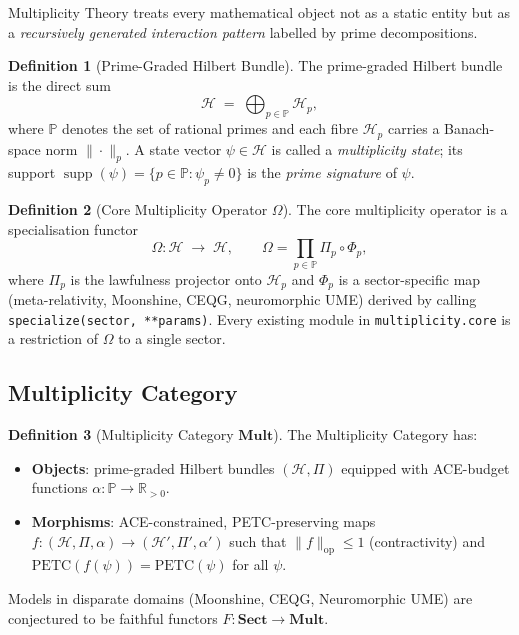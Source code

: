 \documentclass[12pt,a4paper]{article}
\theoremstyle{definition}
\newtheorem{definition}{Definition}[section]
\theoremstyle{plain}
\theoremstyle{remark}
\begin{document}
Multiplicity Theory treats every mathematical object not as a static entity but
as a \emph{recursively generated interaction pattern} labelled by prime
decompositions.

\begin{definition}[Prime-Graded Hilbert Bundle]
\label{def:hilbert-bundle}
The prime-graded Hilbert bundle is the direct sum
\begin{equation}
  \mathcal{H} \;=\; \bigoplus_{p \in \mathbb{P}} \mathcal{H}_p,
\end{equation}
where $\mathbb{P}$ denotes the set of rational primes and each fibre
$\mathcal{H}_p$ carries a Banach-space norm $\|\cdot\|_p$. A state vector
$\psi \in \mathcal{H}$ is called a \emph{multiplicity state}; its support
$\operatorname{supp}(\psi) = \{p \in \mathbb{P} : \psi_p \neq 0\}$ is the
\emph{prime signature} of $\psi$.
\end{definition}

\begin{definition}[Core Multiplicity Operator $\Omega$]
\label{def:omega}
The core multiplicity operator is a specialisation functor
\begin{equation}
  \Omega : \mathcal{H} \;\longrightarrow\; \mathcal{H}, \qquad
  \Omega = \prod_{p \in \mathbb{P}} \Pi_p \circ \Phi_p,
\end{equation}
where $\Pi_p$ is the lawfulness projector onto $\mathcal{H}_p$ and $\Phi_p$ is
a sector-specific map (meta-relativity, Moonshine, CEQG, neuromorphic UME)
derived by calling \texttt{specialize(sector, **params)}.
Every existing module in \texttt{multiplicity.core} is a restriction of $\Omega$
to a single sector.
\end{definition}

\subsection{Multiplicity Category}

\begin{definition}[Multiplicity Category $\mathbf{Mult}$]
The Multiplicity Category has:
\begin{itemize}
  \item \textbf{Objects}: prime-graded Hilbert bundles $(\mathcal{H},\Pi)$
    equipped with ACE-budget functions $\alpha : \mathbb{P} \to \mathbb{R}_{>0}$.
  \item \textbf{Morphisms}: ACE-constrained, PETC-preserving maps
    $f : (\mathcal{H},\Pi,\alpha) \to (\mathcal{H}',\Pi',\alpha')$ such that
    $\|f\|_{\mathrm{op}} \le 1$ (contractivity) and
    $\mathrm{PETC}(f(\psi)) = \mathrm{PETC}(\psi)$ for all $\psi$.
\end{itemize}
Models in disparate domains (Moonshine, CEQG, Neuromorphic UME) are conjectured
to be faithful functors $F : \mathbf{Sect} \to \mathbf{Mult}$.
\end{definition}
\end{document}

